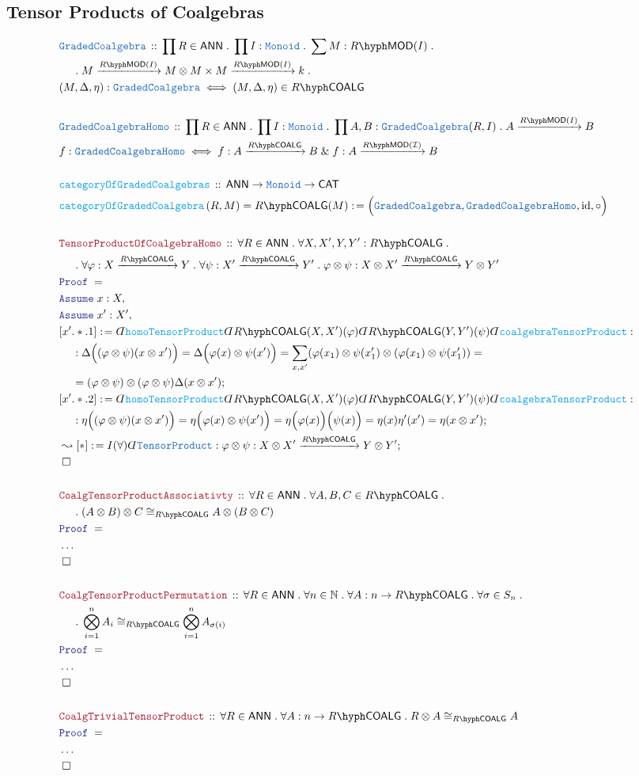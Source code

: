 \documentclass[12pt]{scrartcl}%
\newcommand{\TYPE}[1]{\textcolor{NavyBlue}{\mathtt{#1}}}%
\newcommand{\FUNC}[1]{\textcolor{Cerulean}{\mathtt{#1}}}%
\newcommand{\LOGIC}[1]{\textcolor{Blue}{\mathtt{#1}}}%
\newcommand{\THM}[1]{\textcolor{Maroon}{\mathtt{#1}}}%
\renewcommand{\.}{\; . \;} %
\newcommand{\de}{: \kern 0.1pc =} %
\newcommand{\Act}[1]{\left( #1 \right)} %
\newcommand{\Theorem}[2]{& \THM{#1} \, :: \, #2 \\ & \Proof = \\ } %
\newcommand{\DeclareType}[2]{& \TYPE{#1} \, :: \, #2 \\}%
\newcommand{\DefineType}[3]{& #1 : \TYPE{#2} \iff #3 \\}%
\newcommand{\DeclareFunc}[2]{& \FUNC{#1} \, :: \, #2 \\}%
\newcommand{\DefineNamedFunc}[4]{&  \FUNC{#1}\Act{#2} = #3 \de #4 \\}%
\newcommand{\NewLine}{\\ & \kern 1pc}%
\newcommand{\Page}[1]{ \begin{align*} #1 \end{align*}  }%
\newcommand{ \bd }{ \ByDef }%
\newcommand{\NoProof}{ & \ldots \\ \EndProof}%
\renewcommand{\And}{\; \& \;}%
\newcommand{\Nat}{\mathbb{N}}%
\DeclareMathOperator*{\id}{id}%
\newcommand{\Conclude}[3]{& #1 \de #2 : #3; \\}%
\newcommand{\DeriveConclude}[3]{& \leadsto #1 \de #2 : #3 ; \\} %
\newcommand{\Assume}[2]{& \LOGIC{Assume} \; #1 : #2, \\} %
\newcommand{\QED}{\; \square} %
\newcommand{\EndProof}{& \QED \\} %
\newcommand{\ByDef}{\rotatebox[origin=c]{-180}{$D$}}%
\newcommand{\Proof}{\LOGIC{Proof} \; } %
\newcommand{\Arrow}[1]{\xrightarrow{#1}}%
\newcommand{\I}{\mathcal{I}}
\newcommand{\CAT}{\mathsf{CAT}} %
\newcommand{\LMOD}[1]{#1\hyph\mathsf{MOD}} %
\newcommand{\ANN}{\mathsf{ANN}} %
\newcommand{\COALG}[1]{#1\hyph\mathsf{COALG}}%
\begin{document}
\subsection{Tensor Products of Coalgebras}
\Page{
	\DeclareType{GradedCoalgebra}
	{
		\prod R \in \ANN \. 
		\prod I : \TYPE{Monoid} \. 
		\sum M : \LMOD{R}(I) \. \NewLine \. 
		M \Arrow{\LMOD{R}(I)} M \otimes M \times
		M \Arrow{\LMOD{R}(I)} k \. 
	}
	\DefineType{(M,\Delta,\eta)}{GradedCoalgebra}{(M,\Delta,\eta) \in \COALG{R}}
	\\
	\DeclareType{GradedCoalgebraHomo} 
	{
		\prod R \in \ANN \.
		\prod I : \TYPE{Monoid} \.
		\prod A,B : \TYPE{GradedCoalgebra}(R,I) \.
		A \Arrow{\LMOD{R}(I)} B
	}
	\DefineType{f}{GradedCoalgebraHomo}{ f : A \Arrow{\COALG{R}} B \And f : A \Arrow{\LMOD{R}(\I)} B}
	\\
	\DeclareFunc{categoryOfGradedCoalgebras}
	{
		\ANN \to \TYPE{Monoid} \to \CAT
	}
	\DefineNamedFunc{categoryOfGradedCoalgebra}{R,M}{\COALG{R}(M)}{ \Big( \TYPE{GradedCoalgebra}, \TYPE{GradedCoalgebraHomo}, \id,\circ \Big) } 
	\\
	\Theorem{TensorProductOfCoalgebraHomo}
	{
		\forall R \in \ANN \.
		\forall X, X', Y, Y' : \COALG{R} \. \NewLine \. 
		\forall \varphi : X \Arrow{\COALG{R}} Y \. 
		\forall \psi : X' \Arrow{\COALG{R}} Y' \. 
		\varphi \otimes \psi : X \otimes X' \Arrow{\COALG{R}} Y \otimes Y' 
	}
	\Assume{x}{X}
	\Assume{x'}{X'}
	\Conclude{[x'.*.1]}{\bd \FUNC{homoTensorProduct} \bd \COALG{R}(X,X')(\varphi)\bd \COALG{R}(Y,Y')(\psi)\bd \FUNC{coalgebraTensorProduct}}
	{  
		\NewLine:
		\Delta\Big((\varphi \otimes \psi)(x \otimes x')\Big) = 
		\Delta\Big(\varphi(x) \otimes \psi(x')\Big) =
		\sum_{x,x'} (\varphi(x_1) \otimes \psi(x'_1) \otimes (\varphi(x_1) \otimes \psi(x'_1)) = \NewLine =  
		(\varphi \otimes \psi) \otimes (\varphi \otimes \psi) \Delta(x \otimes x')
	}
	\Conclude{[x'.*.2]}{\bd \FUNC{homoTensorProduct} \bd \COALG{R}(X,X')(\varphi)\bd \COALG{R}(Y,Y')(\psi)\bd \FUNC{coalgebraTensorProduct}}
	{  
		\NewLine :
		\eta\Big((\varphi \otimes \psi)(x \otimes x')\Big) = 
		\eta\Big(\varphi(x) \otimes \psi(x')\Big) =
		\eta\Big(\varphi(x)\Big)\Big( \psi(x)\Big)  = 
		\eta(x)\eta'(x') = \eta(x \otimes x')
	}
	\DeriveConclude{[*]}{I(\forall)\bd \TYPE{TensorProduct}}{ \varphi \otimes \psi : X \otimes X' \Arrow{\COALG{R}} Y \otimes Y'  }
	\EndProof
	\\
	\Theorem{CoalgTensorProductAssociativty}{\forall R \in \ANN \. \forall A,B,C \in \COALG{R} \. 
		\NewLine \. (A \otimes B) \otimes C \cong_{\COALG{R}} A \otimes (B \otimes C)}
	\NoProof
	\\
	\Theorem{CoalgTensorProductPermutation}{
		\forall R \in \ANN \. 
		\forall n \in \Nat \. 
		\forall A : n \to  \COALG{R} \. 
		\forall \sigma \in S_n \. \NewLine \.
		\bigotimes^n_{i=1} A_i \cong_{\COALG{R}} \bigotimes^n_{i=1} A_{\sigma(i)} 
	}
	\NoProof
	\\
	\Theorem{CoalgTrivialTensorProduct}{
		\forall R \in \ANN \. 
		\forall A : n \to \COALG{R} \. 
		R \otimes A \cong_{\COALG{R}} A
	}
	\NoProof
}
\end{document}
